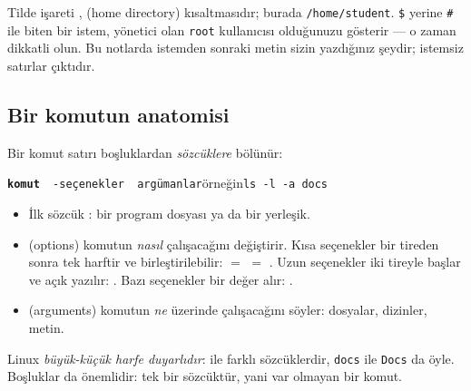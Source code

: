 \begin{center}
\end{center}

Tilde işareti \texttt{\tl},  (home directory) kısaltmasıdır; burada \texttt{/home/student}. \texttt{\$} yerine \texttt{\#} ile biten bir istem, yönetici olan \texttt{root} kullanıcısı olduğunuzu gösterir --- o zaman dikkatli olun. Bu notlarda istemden sonraki metin sizin yazdığınız şeydir; istemsiz satırlar çıktıdır.

\subsection{Bir komutun anatomisi}

Bir komut satırı boşluklardan \emph{sözcüklere} bölünür:
\begin{center}
\texttt{\textbf{komut}\ \ -seçenekler\ \ argümanlar}\qquad örneğin\qquad \texttt{ls -l -a docs}
\end{center}
\begin{itemize}
  \item İlk sözcük : bir program dosyası ya da bir yerleşik.
  \item {} (options) komutun \emph{nasıl} çalışacağını değiştirir. Kısa seçenekler bir tireden sonra tek harftir ve birleştirilebilir:  $=$  $=$ . Uzun seçenekler iki tireyle başlar ve açık yazılır: . Bazı seçenekler bir değer alır: .
  \item {} (arguments) komutun \emph{ne} üzerinde çalışacağını söyler: dosyalar, dizinler, metin.
\end{itemize}
Linux \emph{büyük-küçük harfe duyarlıdır}:  ile  farklı sözcüklerdir, \texttt{docs} ile \texttt{Docs} da öyle. Boşluklar da önemlidir:  tek bir sözcüktür, yani var olmayan bir komut.

